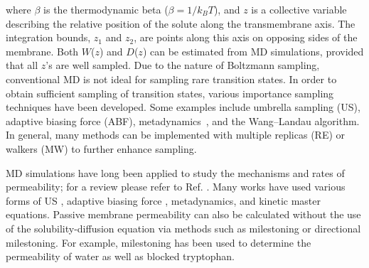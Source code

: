 where $\beta$ is the thermodynamic beta ($\beta=1/k_{B}T$), and $z$ is a collective variable describing the relative position of the solute along the transmembrane axis. The integration bounds, $z_1$ and $z_2$, are points along this axis on opposing sides of the membrane.
Both $W$($z$) and $D$($z$) can be estimated from MD simulations, provided that all $z$'s are well sampled.
Due to the nature of Boltzmann sampling, conventional MD is not ideal for sampling rare transition states. In order to obtain sufficient sampling of transition states, various importance sampling techniques have been developed. Some examples include umbrella sampling (US)\cite{Torrie1977}, adaptive biasing force (ABF)\cite{Rodriguez-Gomez2004,Darve2001,Darve2008a,Wei2011}, metadynamics~\cite{Laio2002}, and the Wang--Landau algorithm\cite{Wang2001}. In general, many methods can be implemented with multiple replicas (RE) or walkers (MW) to further enhance sampling\cite{Swendsen1986a}.
\par MD simulations have long been applied to study the mechanisms and rates of permeability; for a review please refer to Ref. . Many works have used various forms of US \cite{Wilson1996,Grossfield2002,Ulander2003a,Bemporad2004,MacCallum2007,Johansson2008,MacCallum2008,Bauer2011,Tejwani2011,MacCallum2011,Paloncyova2012,Swift2013,Riahi2014,Carpenter2014,Issack2015}, adaptive biasing force \cite{Bemporad2005,Comer2014a}, metadynamics\cite{Ghaemi2012}, and kinetic master equations\cite{Parisio2013}. Passive membrane permeability can also be calculated without the use of the solubility-diffusion equation via methods such as milestoning or directional milestoning\cite{Kirmizialtin2011,Vanden-Eijnden2008,Majek2010,Bello-Rivas2015}. For example, milestoning has been used to determine the permeability of water as well as blocked tryptophan\cite{Cardenas2012,Cardenas2014}.

